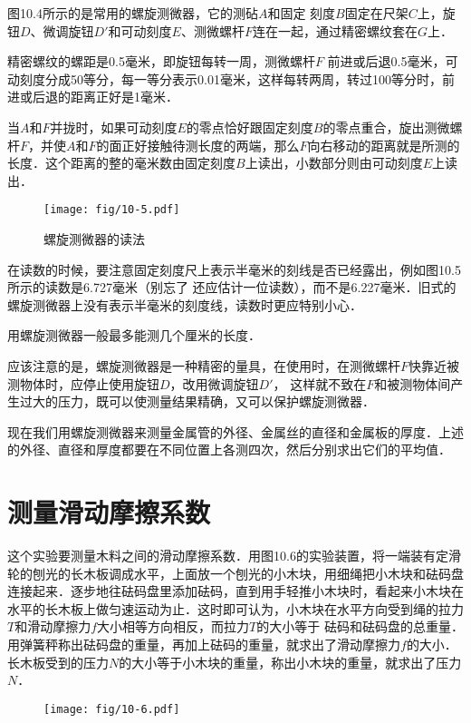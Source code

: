 图10.4所示的是常用的螺旋测微器，它的测砧$A$和固定
刻度$B$固定在尺架$C$上，旋钮$D$、微调旋钮$D'$和可动刻度$E$、测微螺杆$F$连在一起，通过精密螺纹套在$G$上．

精密螺纹的螺距是0.5毫米，即旋钮每转一周，测微螺杆$F$ 前进或后退0.5毫米，可动刻度分成50等分，每一等分表示0.01毫米，这样每转两周，转过100等分时，前进或后退的距离正好是1毫米．

当$A$和$F$并拢时，如果可动刻度$E$的零点恰好跟固定刻度$B$的零点重合，旋出测微螺杆$F$，并使$A$和$F$的面正好接触待测长度的两端，那么$F$向右移动的距离就是所测的长度．这个距离的整的毫米数由固定刻度$B$上读出，小数部分则由可动刻度$E$上读出．
\begin{figure}[htp]
    \centering
    \texttt{[image: fig/10-5.pdf]}
    \caption{螺旋测微器的读法}
\end{figure}

在读数的时候，要注意固定刻度尺上表示半毫米的刻线是否已经露出，例如图10.5所示的读数是6.727毫米（别忘了	
还应估计一位读数），而不是6.227毫米．旧式的螺旋测微器上没有表示半毫米的刻度线，读数时更应特别小心．

用螺旋测微器一般最多能测几个厘米的长度．

应该注意的是，螺旋测微器是一种精密的量具，在使用时，在测微螺杆$F$快靠近被测物体时，应停止使用旋钮$D$，改用微调旋钮$D'$， 这样就不致在$F$和被测物体间产生过大的压力，既可以使测量结果精确，又可以保护螺旋测微器．

现在我们用螺旋测微器来测量金属管的外径、金属丝的直径和金属板的厚度．上述的外径、直径和厚度都要在不同位置上各测四次，然后分别求出它们的平均值．

\section{测量滑动摩擦系数}

这个实验要测量木料之间的滑动摩擦系数．用图10.6的实验装置，将一端装有定滑轮的刨光的长木板调成水平，上面放一个刨光的小木块，用细绳把小木块和砝码盘连接起来．逐步地往砝码盘里添加砝码，直到用手轻推小木块时，看起来小木块在水平的长木板上做匀速运动为止．这时即可认为，小木块在水平方向受到绳的拉力$T$和滑动摩擦力$f$大小相等方向相反，而拉力$T$的大小等于	
砝码和砝码盘的总重量．用弹簧秤称出砝码盘的重量，再加上砝码的重量，就求出了滑动摩擦力$f$的大小．长木板受到的压力$N$的大小等于小木块的重量，称出小木块的重量，就求出了压力$N$．
\begin{figure}[htp]\centering
\texttt{[image: fig/10-6.pdf]}
\caption{}
\end{figure}

